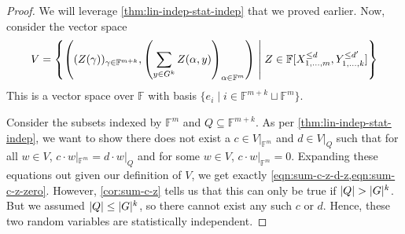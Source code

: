 \documentclass[english,12pt]{reedthesis}
\theoremstyle{plain}
\theoremstyle{definition}
\newtheorem{defn}[defn]{Definition}
\theoremstyle{remark}
\DeclarePairedDelimiter{\abs}{\lvert}{\rvert}
\newcommand{\middlemid}{%
  \ensuremath{\;\middle\vert\;}
}
\begin{document}
\begin{proof}
  We will leverage \cref{thm:lin-indep-stat-indep} that we proved earlier. Now,
  consider the vector space
  \begin{equation}
    V = \mleft\{
      \mleft(
        (Z(\gamma))_{\gamma \in \mathbb{F}^{m+k}}, \mleft(\sum_{y \in G^{k}}Z(\alpha, y)\mright)_{\alpha \in \mathbb{F}^{m}}
      \mright)
      \middlemid
      Z \in \mathbb{F}[X_{1, \ldots, m}^{\le d}, Y_{1, \ldots, k}^{\le d'}]
    \mright\}
  \end{equation}
  This is a vector space over $\mathbb{F}$ with basis
  $\{e_{i} \mid i \in \mathbb{F}^{m+k} \sqcup \mathbb{F}^{m}\}$.

  Consider the subsets indexed by $\mathbb{F}^{m}$ and $Q \subseteq \mathbb{F}^{m+k}$.
  As per \cref{thm:lin-indep-stat-indep}, we want to show there does not exist a
  $c \in V|_{\mathbb{F}^{m}}$ and $d \in V|_{Q}$ such that for all $w \in V$,
  $c \cdot w|_{\mathbb{F}^{m}} = d \cdot w|_{Q}$ and for some $w \in V$,
  $c \cdot w|_{\mathbb{F}^{m}} = 0$. Expanding these equations out given our
  definition of $V$, we get exactly \cref{eqn:sum-c-z-d-z,eqn:sum-c-z-zero}.
  However, \cref{cor:sum-c-z} tells us that this can only be true if
  $\abs{Q} > \abs{G}^{k}$. But we assumed $\abs{Q} \le \abs{G}^{k}$, so there
  cannot exist any such $c$ or $d$. Hence, these two random variables are
  statistically independent.
\end{proof}




\end{document}
